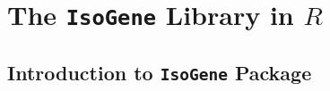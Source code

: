 \chapter{The \texttt{IsoGene} Library in $R$}
 \label{chap: isogene}

\section{Introduction to \texttt{IsoGene} Package}
\label{sec: intro}







